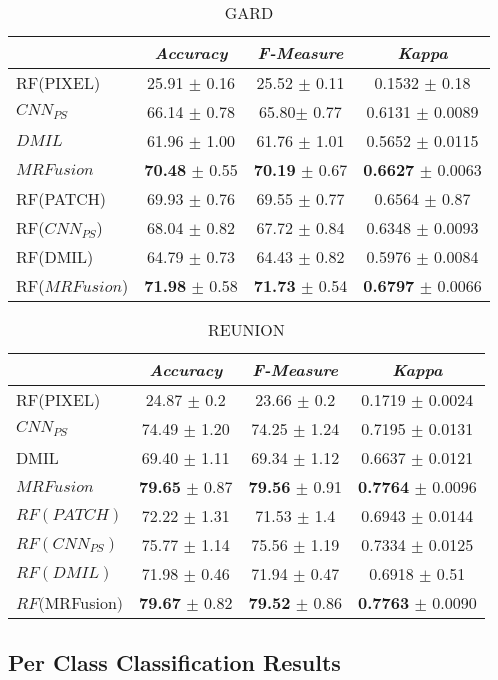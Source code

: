 \documentclass[journal]{IEEEtran}
\newcommand{\method}{$MRFusion$}
\begin{document}
\begin{table}[!ht]
\centering
\scriptsize
 \begin{tabular}{| l || c | c | c |} \hline
& \textit{ Accuracy} & \textit{ F-Measure} &\textit{ Kappa} \\ \hline \hline
  RF(PIXEL) 	& 25.91 $\pm$ 0.16 & 25.52 $\pm$ 0.11 & 0.1532 $\pm$ 0.18 \\ \hline
 $CNN_{PS}$ 	&  66.14 $\pm$ 0.78 & 65.80$\pm$ 0.77 & 0.6131 $\pm$ 0.0089	\\ \hline
 $DMIL$ &  61.96 $\pm$ 1.00 & 61.76 $\pm$	1.01 &	0.5652 $\pm$ 0.0115 \\ \hline
  \method & \textbf{70.48} $\pm$ 0.55 & \textbf{70.19} $\pm$ 0.67 & \textbf{0.6627} $\pm$ 0.0063	\\
 \hline \hline
 RF(PATCH)	& 69.93 $\pm$ 0.76 &  69.55 $\pm$ 0.77 & 0.6564 $\pm$ 0.87 \\ \hline
 RF($CNN_{PS}$) & 68.04 $\pm$ 0.82 & 67.72 $\pm$ 0.84 & 0.6348 $\pm$ 0.0093 \\ \hline
RF(DMIL) & 64.79 $\pm$ 0.73 & 64.43 $\pm$ 0.82 & 0.5976 $\pm$
0.0084 \\ \hline
RF(\method) & \textbf{71.98} $\pm$ 0.58 & \textbf{71.73} $\pm$ 0.54 &	\textbf{0.6797} $\pm$ 0.0066 \\
\hline
\hline
 \end{tabular}
 \caption{GARD \label{tab:GardGen}}
\end{table}\begin{table}[!ht]
\centering
\scriptsize
 \begin{tabular}{| l || c | c | c |} \hline
& \textit{ Accuracy} & \textit{ F-Measure} &\textit{ Kappa} \\ \hline \hline

 RF(PIXEL) 	& 24.87 $\pm$ 0.2  & 23.66 $\pm$ 0.2 & 0.1719 $\pm$ 0.0024	\\ \hline
 $CNN_{PS}$ & 74.49 $\pm$ 1.20 &  74.25 $\pm$ 1.24 & 0.7195 $\pm$ 0.0131 \\ \hline
 DMIL & 69.40 $\pm$ 1.11 & 69.34 $\pm$ 1.12	& 0.6637 $\pm$ 0.0121	\\ \hline
  \method & \textbf{79.65} $\pm$ 0.87 & \textbf{79.56} $\pm$ 0.91 & \textbf{0.7764} $\pm$ 0.0096\\ \hline \hline
 $RF(PATCH)$	& 72.22 $\pm$ 1.31 & 71.53 $\pm$ 1.4 & 0.6943 $\pm$ 0.0144 \\ \hline
$RF(CNN_{PS})$ & 75.77 $\pm$ 1.14 & 75.56 $\pm$ 1.19 & 0.7334 $\pm$ 0.0125\\ \hline
$RF(DMIL)$ & 71.98 $\pm$ 0.46 & 71.94 $\pm$ 0.47 & 0.6918 $\pm$ 0.51\\ \hline
$RF(\method)$ & \textbf{79.67} $\pm$ 0.82 & \textbf{79.52} $\pm$ 0.86 & \textbf{0.7763} $\pm$ 0.0090 \\ \hline

\hline
 \end{tabular}
 \caption{REUNION \label{tab:ReunionGen}}
\end{table}\subsection{Per Class Classification Results}
\end{document}
